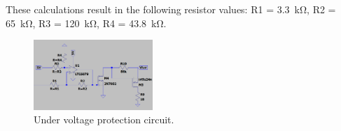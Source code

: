 These calculations result in the following resistor values: R1 = \SI{3.3}{\kilo\ohm}, R2 = \SI{65}{\kilo\ohm}, R3 = \SI{120}{\kilo\ohm}, R4 = \SI{43.8}{\kilo\ohm}.

\begin{figure}[H]
\centering
\includegraphics[width = 0.4\textwidth]{./Figures/Schmitt_Trig.png}
\caption{Under voltage protection circuit.}
\label{fig:schmitt_trig}
\end{figure}








